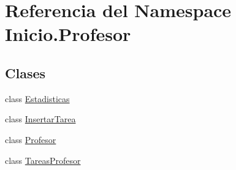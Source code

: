 \hypertarget{namespaceInicio_1_1Profesor}{}\section{Referencia del Namespace Inicio.\+Profesor}
\label{namespaceInicio_1_1Profesor}
\subsection*{Clases}
\begin{DoxyCompactItemize}
\item 
class \mbox{\hyperlink{classInicio_1_1Profesor_1_1Estadisticas}{Estadisticas}}
\item 
class \mbox{\hyperlink{classInicio_1_1Profesor_1_1InsertarTarea}{Insertar\+Tarea}}
\item 
class \mbox{\hyperlink{classInicio_1_1Profesor_1_1Profesor}{Profesor}}
\item 
class \mbox{\hyperlink{classInicio_1_1Profesor_1_1TareasProfesor}{Tareas\+Profesor}}
\end{DoxyCompactItemize}
